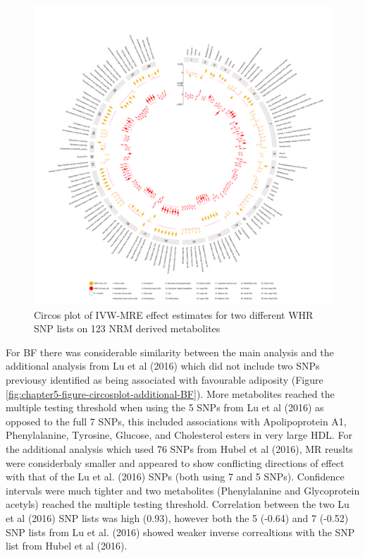 \documentclass[11pt,twoside]{bristolthesis}
\begin{document}
\begin{figure}
\includegraphics[width=1\linewidth]{data/chapter5/figures/circosplot_additional_WHR} \caption{Circos plot of IVW-MRE effect estimates for two different WHR SNP lists on 123 NRM derived metabolites}\label{fig:chapter5-figure-circosplot-additional-WHR}
\end{figure}
For BF there was considerable similarity between the main analysis and the additional analysis from Lu et al (2016) which did not include two SNPs previousy identified as being associated with favourable adiposity (Figure \ref{fig:chapter5-figure-circosplot-additional-BF}). More metabolites reached the multiple testing threshold when using the 5 SNPs from Lu et al (2016) as opposed to the full 7 SNPs, this included associations with Apolipoprotein A1, Phenylalanine, Tyrosine, Glucose, and Cholesterol esters in very large HDL. For the additional analysis which used 76 SNPs from Hubel et al (2016), MR reuslts were considerbaly smaller and appeared to show conflicting directions of effect with that of the Lu et al. (2016) SNPs (both using 7 and 5 SNPs). Confidence intervals were much tighter and two metabolites (Phenylalanine and Glycoprotein acetyls) reached the multiple testing threshold. Correlation between the two Lu et al (2016) SNP lists was high (0.93), however both the 5 (-0.64) and 7 (-0.52) SNP lists from Lu et al. (2016) showed weaker inverse correaltions with the SNP list from Hubel et al (2016).
\end{document}
